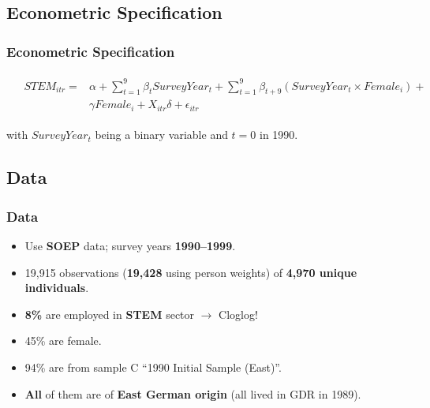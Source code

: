 \documentclass[11pt, aspectratio=1610, xcolor={dvipsnames}]{beamer}
\newcommand{\highlight}[1]{\textbf{\textcolor{PineGreen}{#1}}}
\begin{document}
	\subsection{Econometric Specification}
	\begin{frame}
		\frametitle{Econometric Specification}
		
			{\linespread{1}\normalsize
				\begin{align}
					&\begin{aligned}
						\label{eq:spec}
						STEM_{itr} = & \alpha + \sum_{t=1}^{9}\beta_{t} SurveyYear_{t} + \sum_{t=1}^{9}\beta_{t + 9} (SurveyYear_{t} \times Female_{i}) +\\
						& \gamma Female_{i} + X_{itr} \delta + \epsilon_{itr}
					\end{aligned}
				\end{align}
			}
		
		\vspace{1cm}
		
		with $SurveyYear_{t}$ being a binary variable and $t = 0$ in 1990.
		
	\end{frame}
	
	\subsection{Data}
	\begin{frame}
		\frametitle{Data}
		
		\begin{itemize}
			\item Use \highlight{SOEP} data; survey years \highlight{1990--1999}.
			\item 19,915 observations (\highlight{19,428} using person weights) of \highlight{4,970 unique individuals}.
			\item \highlight{8\%} are employed in \highlight{STEM} sector $\longrightarrow$ Cloglog!
			\item 45\% are female.
			\item 94\% are from sample C ``1990 Initial Sample (East)''.
			\item \highlight{All} of them are of \highlight{East German origin} (all lived in GDR in 1989).
		\end{itemize}
		
	\end{frame}
	
\end{document}
